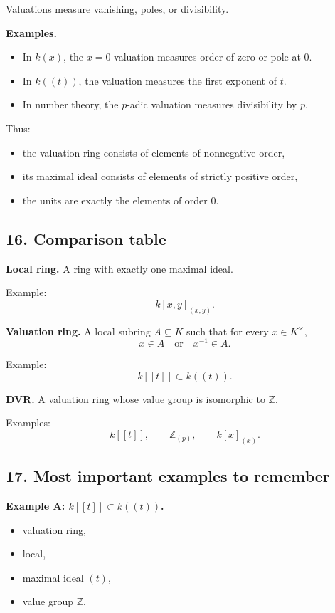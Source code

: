 \documentclass[12pt,a4paper]{article}
\theoremstyle{notespace}
\begin{document}
Valuations measure vanishing, poles, or divisibility.

\textbf{Examples.}
\begin{itemize}
	\item In \(k(x)\), the \(x=0\) valuation measures order of zero or pole at \(0\).
	\item In \(k((t))\), the valuation measures the first exponent of \(t\).
	\item In number theory, the \(p\)-adic valuation measures divisibility by \(p\).
\end{itemize}

Thus:
\begin{itemize}
	\item the valuation ring consists of elements of nonnegative order,
	\item its maximal ideal consists of elements of strictly positive order,
	\item the units are exactly the elements of order \(0\).
\end{itemize}

\subsection*{16. Comparison table}

\textbf{Local ring.}
A ring with exactly one maximal ideal.

Example:
\[
k[x,y]_{(x,y)}.
\]

\textbf{Valuation ring.}
A local subring \(A\subseteq K\) such that for every \(x\in K^\times\),
\[
x\in A \quad \text{or} \quad x^{-1}\in A.
\]

Example:
\[
k[[t]]\subset k((t)).
\]

\textbf{DVR.}
A valuation ring whose value group is isomorphic to \(\mathbb Z\).

Examples:
\[
k[[t]],\qquad \mathbb Z_{(p)},\qquad k[x]_{(x)}.
\]

\subsection*{17. Most important examples to remember}

\textbf{Example A: \(k[[t]]\subset k((t))\).}
\begin{itemize}
	\item valuation ring,
	\item local,
	\item maximal ideal \((t)\),
	\item value group \(\mathbb Z\).
\end{itemize}
\end{document}
